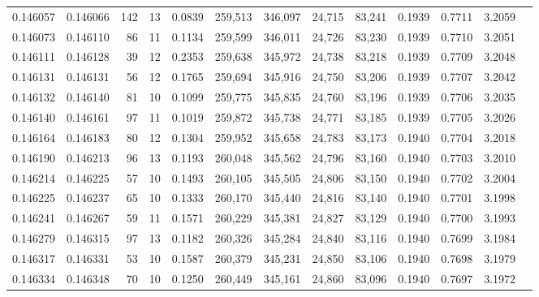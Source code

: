 \begin{tabular}{rrrrrrrrrrrrr}
0.146057 & 0.146066 &   142 &  13 &                                     0.0839 & 259,513 & 346,097 &  24,715 &  83,241 & 0.1939 & 0.7711 & 3.2059 \\
0.146073 & 0.146110 &    86 &  11 &                                     0.1134 & 259,599 & 346,011 &  24,726 &  83,230 & 0.1939 & 0.7710 & 3.2051 \\
0.146111 & 0.146128 &    39 &  12 &                                     0.2353 & 259,638 & 345,972 &  24,738 &  83,218 & 0.1939 & 0.7709 & 3.2048 \\
0.146131 & 0.146131 &    56 &  12 &                                     0.1765 & 259,694 & 345,916 &  24,750 &  83,206 & 0.1939 & 0.7707 & 3.2042 \\
0.146132 & 0.146140 &    81 &  10 &                                     0.1099 & 259,775 & 345,835 &  24,760 &  83,196 & 0.1939 & 0.7706 & 3.2035 \\
0.146140 & 0.146161 &    97 &  11 &                                     0.1019 & 259,872 & 345,738 &  24,771 &  83,185 & 0.1939 & 0.7705 & 3.2026 \\
0.146164 & 0.146183 &    80 &  12 &                                     0.1304 & 259,952 & 345,658 &  24,783 &  83,173 & 0.1940 & 0.7704 & 3.2018 \\
0.146190 & 0.146213 &    96 &  13 &                                     0.1193 & 260,048 & 345,562 &  24,796 &  83,160 & 0.1940 & 0.7703 & 3.2010 \\
0.146214 & 0.146225 &    57 &  10 &                                     0.1493 & 260,105 & 345,505 &  24,806 &  83,150 & 0.1940 & 0.7702 & 3.2004 \\
0.146225 & 0.146237 &    65 &  10 &                                     0.1333 & 260,170 & 345,440 &  24,816 &  83,140 & 0.1940 & 0.7701 & 3.1998 \\
0.146241 & 0.146267 &    59 &  11 &                                     0.1571 & 260,229 & 345,381 &  24,827 &  83,129 & 0.1940 & 0.7700 & 3.1993 \\
0.146279 & 0.146315 &    97 &  13 &                                     0.1182 & 260,326 & 345,284 &  24,840 &  83,116 & 0.1940 & 0.7699 & 3.1984 \\
0.146317 & 0.146331 &    53 &  10 &                                     0.1587 & 260,379 & 345,231 &  24,850 &  83,106 & 0.1940 & 0.7698 & 3.1979 \\
0.146334 & 0.146348 &    70 &  10 &                                     0.1250 & 260,449 & 345,161 &  24,860 &  83,096 & 0.1940 & 0.7697 & 3.1972 \\

\end{tabular}
